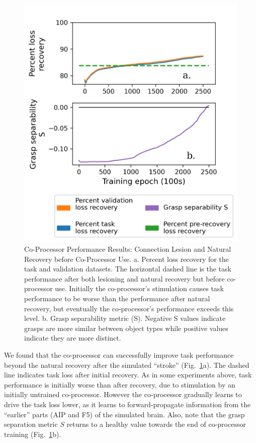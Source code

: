 \documentclass[12pt]{iopart}
\begin{document}
\begin{figure}[h]
\centering
\includegraphics[scale=1]{training_results_recov.png}
\caption{Co-Processor Performance Results: Connection Lesion and Natural Recovery before Co-Processor Use.
         a. Percent loss recovery for the task and validation datasets. The horizontal dashed line is the task
         performance after both lesioning and natural recovery but before co-processor use. Initially the
         co-processor's stimulation causes task performance to be worse than the performance after natural
         recovery, but eventually the co-processor's performance exceeds this level. b. Grasp separability
         metric (S). Negative S values indicate grasps are more similar between object types while positive values
        indicate they are more distinct.
        }
\label{fig:results_recov}
\end{figure}

We found that the co-processor can successfully improve task performance beyond the natural
recovery after the simulated ``stroke'' (Fig.~\ref{fig:results_recov}a). The dashed line
indicates task loss after initial recovery. As in some experiments above, task performance is
initially worse than after recovery, due to stimulation by an  initially untrained co-processor. However
the co-processor gradually learns to drive the task loss lower, as it learns to forward-propagate information
from the ``earlier'' parts (AIP and F5) of the simulated brain. Also, note that the grasp separation metric $S$
returns to a healthy value towards the end of co-processor training
(Fig.~\ref{fig:results_recov}b).
\end{document}

